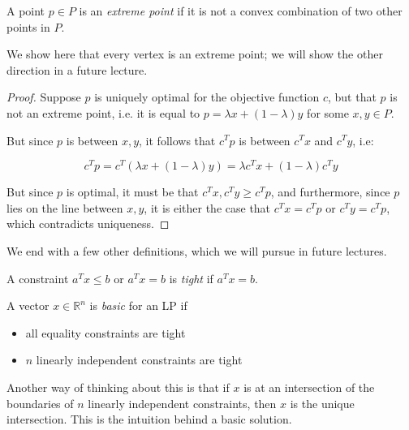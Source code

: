 \documentclass{article}
\newcommand{\reals}{\ensuremath{\mathbb{R}}}
\begin{document}
\begin{definition}
  A point $p \in P$ is an \emph{extreme point} if it is not a convex
  combination of two other points in $P$.
\end{definition}

We show here that every vertex is an extreme point; we will show the
other direction in a future lecture.

\begin{proof}
  Suppose $p$ is uniquely optimal for the objective function $c$, but
  that $p$ is not an extreme point, i.e. it is equal to $p = \lambda x
  + (1-\lambda)y$ for some $x,y \in P$.
  
  But since $p$ is between $x,y$, it follows that $c^T p$ is between
  $c^T x$ and $c^T y$, i.e:
  
  $$
  c^T p = c^T (\lambda x + (1-\lambda) y) = \lambda c^T x +
  (1-\lambda) c^T y$$
  
  But since $p$ is optimal, it must be that $c^T x, c^T y \geq c^T p$,
  and furthermore, since $p$ lies on the line between $x,y$, it is
  either the case that $c^T x = c^T p$ or $c^T y = c^T p$, which
  contradicts uniqueness.
\end{proof}

We end with a few other definitions, which we will pursue in future
lectures.

\begin{definition}
  A constraint $a^T x \leq b$ or $a^T x = b$ is \emph{tight} if $a^T x
  = b$.
\end{definition}

\begin{definition}
  A vector $x \in \reals^n$ is \emph{basic} for an LP if
  \begin{itemize}
  \item all equality constraints are tight
  \item $n$ linearly independent constraints are tight
  \end{itemize}
\end{definition}

Another way of thinking about this is that if $x$ is at an
intersection of the boundaries of $n$ linearly independent
constraints, then $x$ is the unique intersection.  This is the
intuition behind a basic solution.
\end{document}
